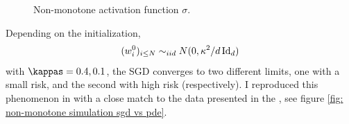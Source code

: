 \documentclass{article}
\begin{document}
\begin{figure}[H]
    \centering
    
    \caption{Non-monotone activation function $\sigma$.}
    \label{fig: non-monotone activation fn}
\end{figure}

\noindent Depending on the initialization,
\begin{equation}
(w^{0}_{i})_{i\leq N}\sim_{iid} N(0, \kappa^{2}/d\operatorname{Id}_{d})
\end{equation}
with $ \kappas = 0.4, 0.1$, the SGD converges to two different limits, one with a small risk,
and the second with high risk (respectively). I reproduced this phenomenon in with a close match to the data presented in the \cite{Mei_2018}, see figure \ref{fig: non-monotone simulation sgd vs pde}.
\end{document}

